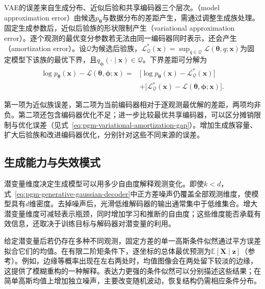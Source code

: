 VAE的误差来自生成分布、近似后验和共享编码器三个层次。（model approximation error）由候选$p_{\bm{\theta}}$与数据分布的差距产生，需通过调整生成族处理。固定生成参数后，近似后验族的形状限制产生（variational approximation error）。逐个观测的最优变分参数若无法由同一编码器同时表示，还会产生（amortization error）。设$\mathcal{Q}$为候选后验族，$\mathcal{L}_{\mathcal{Q}}^*(\bm{x})=\sup_{q\in\mathcal{Q}}\mathcal{L}(\bm{\theta},q;\bm{x})$为固定模型下该族的最优下界，且$q_{\bm{\phi}}(\cdot\mid\bm{x})\in\mathcal{Q}$。下界差距可分解为
\begin{equation}
  \label{eq:pgm-generative-inference-gaps}
  \begin{aligned}
    \log p_{\bm{\theta}}(\bm{x})
      -\mathcal{L}(\bm{\theta},\bm{\phi};\bm{x})
    ={}&\bigl[\log p_{\bm{\theta}}(\bm{x})
             -\mathcal{L}_{\mathcal{Q}}^*(\bm{x})\bigr]\\
       &+\bigl[\mathcal{L}_{\mathcal{Q}}^*(\bm{x})
             -\mathcal{L}(\bm{\theta},\bm{\phi};\bm{x})\bigr].
  \end{aligned}
\end{equation}

第一项为近似族误差，第二项为当前编码器相对于逐观测最优解的差距，两项均非负。第二项还包含编码器优化不足；进一步比较最优共享编码器，可以区分摊销限制与优化误差（见式~\eqref{eq:pgm-variational-amortization-gap}）。增加生成族容量、扩大后验族和改进编码器优化，分别针对这些不同来源的误差。

\subsection{生成能力与失效模式}
\label{sec:pgm-generative-vae-failure}

潜变量维度决定生成模型可以用多少自由度解释观测变化。即使$k<d$，式~\eqref{eq:pgm-generative-gaussian-decoder}中正方差噪声仍覆盖全部观测维度，使模型具有$d$维密度。去掉噪声后，光滑低维解码器的输出通常集中于低维集合。增大潜变量维度可减轻表示瓶颈，同时增加学习和推断的自由度；这些维度能否承载有效信息，还取决于训练目标与解码器对潜变量的利用。

给定潜变量后若仍存在多种不同观测，固定方差的单一高斯条件似然通过平方误差拟合它们的均值。在有限二阶矩条件下，逐坐标的总体最优预测为$\mathbb E[\bm X\mid\bm z]$（参考）。例如，边缘等概率出现在左右两处时，均值图像会在两处留下较淡的边缘，这提供了模糊重构的一种解释。表达力更强的条件似然可以分别描述这些结果；在简单高斯均值上增加独立噪声，主要改变随机波动，恢复结构仍需相应条件分布。

